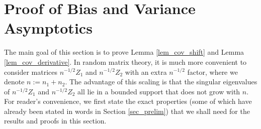 \section{Proof of Bias and Variance Asymptotics} \label{sec_maintools}



The main goal of this section is to prove Lemma \ref{lem_cov_shift} and Lemma \ref{lem_cov_derivative}.
In random matrix theory, it is much more convenient to consider matrices $n^{-1/2}Z_1$ and $n^{-1/2}Z_2$ with an extra $n^{-1/2}$ factor, where we denote $n:=n_1+n_2$.
The advantage of this scaling is that the singular eigenvalues of $n^{-1/2}Z_1$ and $n^{-1/2}Z_2$ all lie in a bounded support that does not grow with $n$. For reader's convenience, we first state the exact properties (some of which have already been stated in words in Section \ref{sec_prelim}) that we shall need for the results and proofs in this section. %

